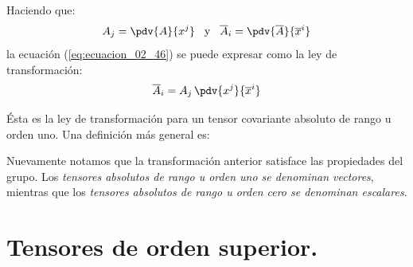 Haciendo que:
\begin{align*}
A_{j} = \pdv{A}{x^{j}} \hspace{0.3cm} \mbox{y} \hspace{0.3cm} \overline{A}_{i} = \pdv{\overline{A}}{\overline{x}^{i}}
\end{align*}
la ecuación (\ref{eq:ecuacion_02_46}) se puede expresar como la ley de transformación:
\begin{align}
\overline{A}_{i} = A_{j} \, \pdv{x^{j}}{\overline{x}^{i}}
\label{eq:ecuacion_02_47}
\end{align}

Ésta es la ley de transformación para un tensor covariante absoluto de rango u orden uno. Una definición más general es:
\begin{center}
    \noindent{}
\end{center}
\par
Nuevamente notamos que la transformación anterior satisface las propiedades del grupo. Los \emph{tensores absolutos de rango u orden uno se denominan vectores}, mientras que los \emph{tensores absolutos de rango u orden cero se denominan escalares}.

\section{Tensores de orden superior.}

